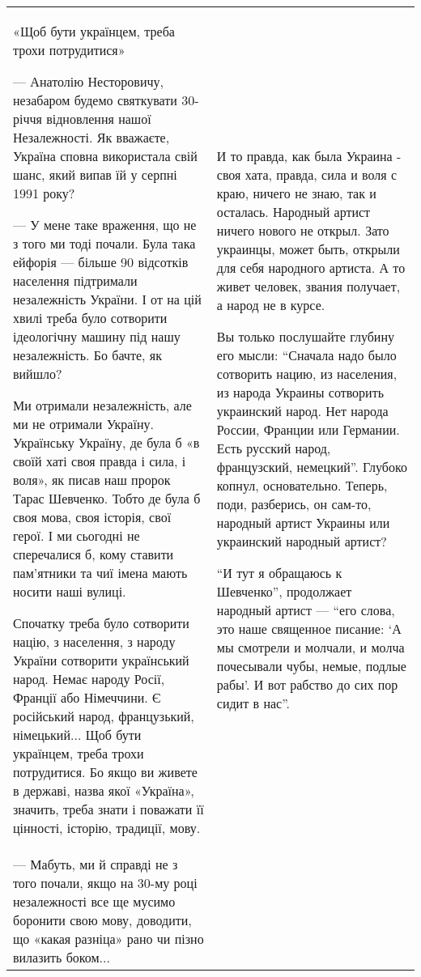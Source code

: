 \begin{longtable}{|p{}|p{}|}
\\

«Щоб бути українцем, треба трохи потрудитися»

— Анатолію Несторовичу, незабаром  будемо святкувати 30-річчя відновлення нашої
Незалежності. Як вважаєте, Україна сповна використала свій шанс, який випав їй
у серпні 1991 року?

— У мене таке враження, що не з того ми тоді почали. Була така ейфорія — більше
90 відсотків населення підтримали незалежність України. І от на цій хвилі треба
було сотворити ідеологічну машину під нашу незалежність. Бо бачте, як вийшло?

Ми отримали незалежність, але ми не отримали Україну. Українську Україну, де
була б «в своїй хаті своя правда і сила, і воля», як писав наш пророк Тарас
Шевченко. Тобто де була б своя мова, своя історія, свої герої. І ми сьогодні не
сперечалися б, кому ставити пам’ятники та чиї імена мають носити наші вулиці.

Спочатку треба було сотворити націю, з населення, з народу України сотворити
український народ. Немає народу Росії, Франції або Німеччини. Є російський
народ, французький, німецький... Щоб бути українцем, треба трохи потрудитися.
Бо якщо ви живете в державі, назва якої «Україна», значить, треба знати і
поважати її цінності, історію, традиції, мову.

& 

И то правда, как была Украина - своя хата, правда, сила и воля с краю, ничего
не знаю, так и осталась. Народный артист ничего нового не открыл. Зато
украинцы, может быть, открыли для себя народного артиста. А то живет человек,
звания получает, а народ не в курсе.

Вы только послушайте глубину его мысли: \enquote{Сначала надо было сотворить нацию, из
населения, из народа Украины сотворить украинский народ. Нет народа России,
Франции или Германии. Есть русский народ, французский, немецкий}. Глубоко
копнул, основательно. Теперь, поди, разберись, он сам-то, народный артист
Украины или украинский народный артист?

\enquote{И тут я обращаюсь к Шевченко}, продолжает народный артист —
\enquote{его слова, это наше священное писание: \enquote{А мы смотрели и
молчали, и молча почесывали чубы, немые, подлые рабы}. И вот рабство до сих пор
сидит в нас}.

\\

— Мабуть, ми й справді не з того почали, якщо на 30-му році незалежності все ще
мусимо боронити свою мову, доводити, що «какая разніца» рано чи пізно вилазить
боком...


\end{longtable}
